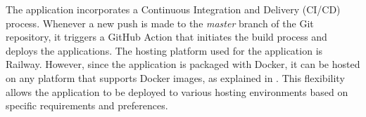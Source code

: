 The application incorporates a Continuous Integration and Delivery (CI/CD)
process. Whenever a new push is made to the \textit{master} branch of the Git
repository, it triggers a GitHub Action that initiates the build process and
deploys the applications. The hosting platform used for the application is
Railway. However, since the application is packaged with Docker, it can be
hosted on any platform that supports Docker images, as explained in
. This flexibility allows the application to be deployed to
various hosting environments based on specific requirements and preferences.
